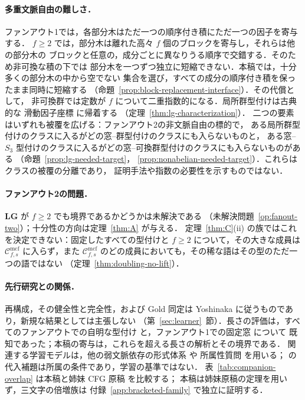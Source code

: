 \documentclass[11pt,a4paper]{ltjsarticle}
\numberwithin{equation}{section}
\theoremstyle{plain}
\theoremstyle{definition}
\theoremstyle{remark}
\newcommand{\Cmcf}[2]{\mathcal{C}^{\mathrm{mcf}}_{#1,#2}}
\theoremstyle{plain}
\begin{document}
\paragraph{多重文脈自由の難しさ．}
ファンアウト1では，各部分木はただ一つの順序付き積にただ一つの因子を寄与する．
$f\ge2$ では，部分木は離れた高々 $f$ 個のブロックを寄与し，それらは他の部分木の
ブロックと任意の，成分ごとに異なりうる順序で交錯する．そのため非可換な積の下では
部分木を一つずつ独立に短縮できない．本稿では，十分多くの部分木の中から空でない
集合を選び，すべての成分の順序付き積を保ったまま同時に短縮する
（命題~\ref{prop:block-replacement-interface}）．その代償として，
非可換群では定数が $f$ について二重指数的になる．局所群型付けは古典的な
滑動因子座標 \cite{Straubing1985,Tilson1987,AlmeidaEtAl2009} に帰着する
（定理~\ref{thm:lg-characterization}）．
二つの要素はいずれも被覆を広げる：ファンアウト2の非文脈自由の標的で，
ある局所群型付けのクラスに入るがどの窓--群型付けのクラスにも入らないものと，
ある窓--$S_3$ 型付けのクラスに入るがどの窓--可換群型付けのクラスにも入らないものがある
（命題~\ref{prop:lg-needed-target}，
\ref{prop:nonabelian-needed-target}）．これらはクラスの被覆の分離であり，
証明手法や指数の必要性を示すものではない．

\paragraph{ファンアウト2の問題．}
$\mathbf{LG}$ が $f\ge2$ でも境界であるかどうかは未解決である
（未解決問題~\ref{op:fanout-two}）；十分性の方向は定理~\ref{thm:A} が与える．
定理~\ref{thm:C}(ii) の族ではこれを決定できない：固定したすべての型付けと
$f\ge2$ について，その大きな成員は $\Cmcf{f}{s}$ に入らず，また
$\Cmcf{f}{s}$ のどの成員においても，その稀な語はその型のただ一つの語ではない
（定理~\ref{thm:doubling-no-lift}）．

\paragraph{先行研究との関係．}
再構成，その健全性と完全性，および Gold 同定は Yoshinaka
\cite{Yoshinaka2011,Yoshinaka2015General} に従うものであり，新規な結果としては主張しない
（第~\ref{sec:learner}~節）．長さの評価は，すべてのファンアウトでの自明な型付け
\cite{Yoshinaka2011} と，ファンアウト1での固定窓 \cite{Yoshinaka2008} について
既知であった；本稿の寄与は，これらを超える長さの解析とその境界である．
関連する学習モデルは，他の弱文脈依存の形式体系 \cite{OatesEtAl2006} や
所属性質問 \cite{Yoshinaka2010,ClarkYoshinaka2014,KanazawaYoshinaka2023} を用いる；
\cite{DuncanEtAl2026Substitution} の代入補題は所属の条件であり，学習の基準ではない．
表~\ref{tab:companion-overlap} は本稿と姉妹 CFG 原稿 \cite{kuriyamaCFG} を比較する；
本稿は姉妹原稿の定理を用いず，三文字の倍増族は
付録~\ref{app:bracketed-family} で独立に証明する．
\end{document}
